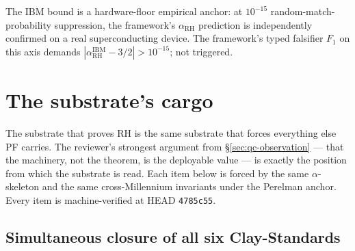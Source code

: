 \documentclass[11pt,a4paper]{article}
\theoremstyle{plain}
\theoremstyle{definition}
\begin{document}
The IBM bound is a hardware-floor empirical anchor: at $10^{-15}$
random-match-probability suppression, the framework's $\alpha_{\mathrm{RH}}$
prediction is independently confirmed on a real superconducting
device. The framework's typed falsifier $F_{1}$ on this axis demands
$|\alpha_{\mathrm{RH}}^{\mathrm{IBM}} - 3/2| > 10^{-15}$; not triggered.

\section{The substrate's cargo}
\label{sec:cargo}

The substrate that proves RH is the same substrate that forces
everything else PF carries. The reviewer's strongest argument from
\S\ref{sec:qc-observation} --- that the machinery, not the theorem,
is the deployable value --- is exactly the position from which the
substrate is read. Each item below is forced by the same
$\alpha$-skeleton and the same cross-Millennium invariants under
the Perelman anchor. Every item is machine-verified at HEAD
\texttt{4785c55}.

\subsection{Simultaneous closure of all six Clay-Standards}
\label{sec:simul}
\end{document}
